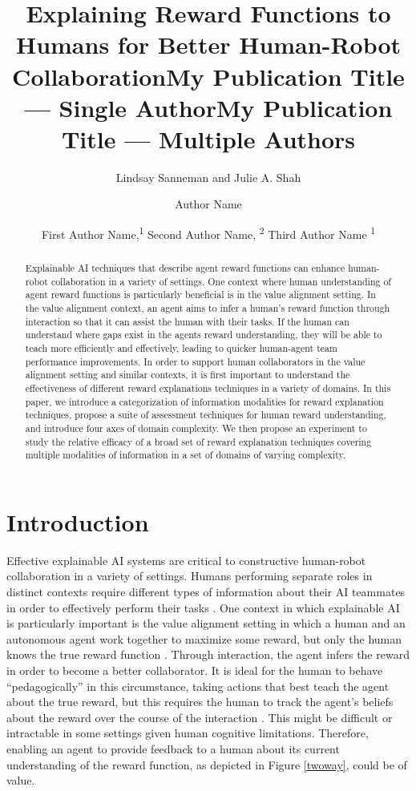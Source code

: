\documentclass[letterpaper]{article} %
\title{Explaining Reward Functions to Humans for Better Human-Robot Collaboration}
\author{
    Lindsay Sanneman and Julie A. Shah
    \\
}
\title{My Publication Title --- Single Author}
\author {
    Author Name \\
}
\title{My Publication Title --- Multiple Authors}
\author {
    First Author Name,\textsuperscript{\rm 1}
    Second Author Name, \textsuperscript{\rm 2}
    Third Author Name \textsuperscript{\rm 1} \\
}
\begin{document}
\maketitle

\begin{abstract}
Explainable AI techniques that describe agent reward functions can enhance human-robot collaboration in a variety of settings. One context where human understanding of agent reward functions is particularly beneficial is in the value alignment setting.  In the value alignment context, an agent aims to infer a human's reward function through interaction so that it can assist the human with their tasks. If the human can understand where gaps exist in the agents reward understanding, they will be able to teach more efficiently and effectively, leading to quicker human-agent team performance improvements. In order to support human collaborators in the value alignment setting and similar contexts, it is first important to understand the effectiveness of different reward explanations techniques in a variety of domains. In this paper, we introduce a categorization of information modalities for reward explanation techniques, propose a suite of assessment techniques for human reward understanding, and introduce four axes of domain complexity. We then propose an experiment to study the relative efficacy of a broad set of reward explanation techniques covering multiple modalities of information in a set of domains of varying complexity.


\end{abstract}


\section{Introduction}

Effective explainable AI systems are critical to constructive human-robot collaboration in a variety of settings. Humans performing separate roles in distinct contexts require different types of information about their AI teammates in order to effectively perform their tasks \cite{sanneman2020situation}. One context in which explainable AI is particularly important is the value alignment setting in which a human and an autonomous agent work together to maximize some reward, but only the human knows the true reward function \cite{fisac2020pragmatic, hadfield2016cooperative}. Through interaction, the agent infers the reward in order to become a better collaborator. It is ideal for the human to behave ``pedagogically'' in this circumstance, taking actions that best teach the agent about the true reward,  but this requires the human to track the agent's beliefs about the reward over the course of the interaction \cite{fisac2020pragmatic}. This might be difficult or intractable in some settings given human cognitive limitations. Therefore, enabling an agent to provide feedback to a human about its current understanding of the reward function, as depicted in Figure \ref{twoway}, could be of value.
\end{document}
